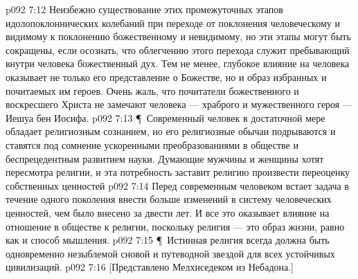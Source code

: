 \vs p092 7:12 Неизбежно существование этих промежуточных этапов идолопоклоннических колебаний при переходе от поклонения человеческому и видимому к поклонению божественному и невидимому, но эти этапы могут быть сокращены, если осознать, что облегчению этого перехода служит пребывающий внутри человека божественный дух. Тем не менее, глубокое влияние на человека оказывает не только его представление о Божестве, но и образ избранных и почитаемых им героев. Очень жаль, что почитатели божественного и воскресшего Христа не замечают человека --- храброго и мужественного героя --- Иешуа бен Иосифа.
\vs p092 7:13 \P\ Современный человек в достаточной мере обладает религиозным сознанием, но его религиозные обычаи подрываются и ставятся под сомнение ускоренными преобразованиями в обществе и беспрецедентным развитием науки. Думающие мужчины и женщины хотят пересмотра религии, и эта потребность заставит религию произвести переоценку собственных ценностей
\vs p092 7:14 Перед современным человеком встает задача в течение одного поколения внести больше изменений в систему человеческих ценностей, чем было внесено за двести лет. И все это оказывает влияние на отношение в обществе к религии, поскольку религия --- это образ жизни, равно как и способ мышления.
\vs p092 7:15 \P\ Истинная религия всегда должна быть одновременно незыблемой сновой и путеводной звездой для всех устойчивых цивилизаций.
\vs p092 7:16 [Представлено Мелхиседеком из Небадона.]
